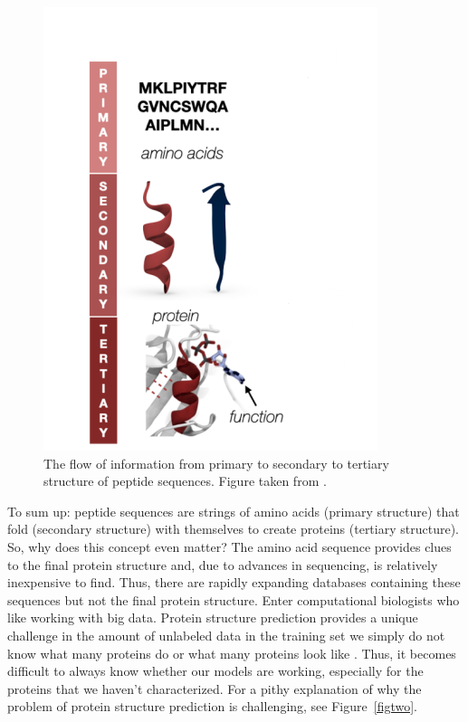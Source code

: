\documentclass{SBCbookchapter}
\begin{document}
\begin{figure}[h!]
	\centerline{\includegraphics{rob_long_1.png}}
	\caption{The flow of information from primary to secondary to tertiary structure of peptide sequences. Figure taken from \cite{ferruz_towards_2022}. }
	\label{figone}
\end{figure}

To sum up: peptide sequences are strings of amino acids (primary structure) that fold (secondary structure) with themselves to create proteins (tertiary structure). So, why does this concept even 
matter? The amino acid sequence provides clues to the final protein structure and, due to advances in sequencing, is relatively inexpensive to find. Thus, there are rapidly expanding databases 
containing these sequences but not the final protein structure. Enter computational biologists who like working with big data. Protein structure prediction provides a unique challenge in the amount of 
unlabeled data in the training set \textemdash we simply do not know what many proteins do or what many proteins look like \cite{bepler_learning_2021}. Thus, it becomes difficult to always know whether 
our models are working, especially for the proteins that we haven’t characterized. For a pithy explanation of why the problem of protein structure prediction is challenging, see Figure~\ref{figtwo}. 
\end{document}
